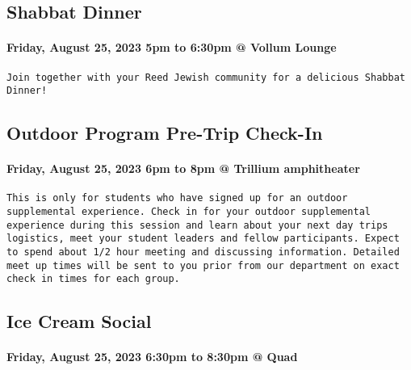 \documentclass[
]{article}
\begin{document}
\hypertarget{shabbat-dinner}{%
\subsection{Shabbat Dinner}\label{shabbat-dinner}}

\hypertarget{friday-august-25-2023-5pm-to-630pm-vollum-lounge}{%
\paragraph{Friday, August 25, 2023 5pm to 6:30pm @ Vollum
Lounge}\label{friday-august-25-2023-5pm-to-630pm-vollum-lounge}}

\begin{verbatim}
Join together with your Reed Jewish community for a delicious Shabbat Dinner!
\end{verbatim}

\hypertarget{outdoor-program-pre-trip-check-in}{%
\subsection{Outdoor Program Pre-Trip
Check-In}\label{outdoor-program-pre-trip-check-in}}

\hypertarget{friday-august-25-2023-6pm-to-8pm-trillium-amphitheater}{%
\paragraph{Friday, August 25, 2023 6pm to 8pm @ Trillium
amphitheater}\label{friday-august-25-2023-6pm-to-8pm-trillium-amphitheater}}

\begin{verbatim}
This is only for students who have signed up for an outdoor supplemental experience. Check in for your outdoor supplemental experience during this session and learn about your next day trips logistics, meet your student leaders and fellow participants. Expect to spend about 1/2 hour meeting and discussing information. Detailed meet up times will be sent to you prior from our department on exact check in times for each group.
\end{verbatim}

\hypertarget{ice-cream-social}{%
\subsection{Ice Cream Social}\label{ice-cream-social}}

\hypertarget{friday-august-25-2023-630pm-to-830pm-quad}{%
\paragraph{Friday, August 25, 2023 6:30pm to 8:30pm @
Quad}\label{friday-august-25-2023-630pm-to-830pm-quad}}
\end{document}

